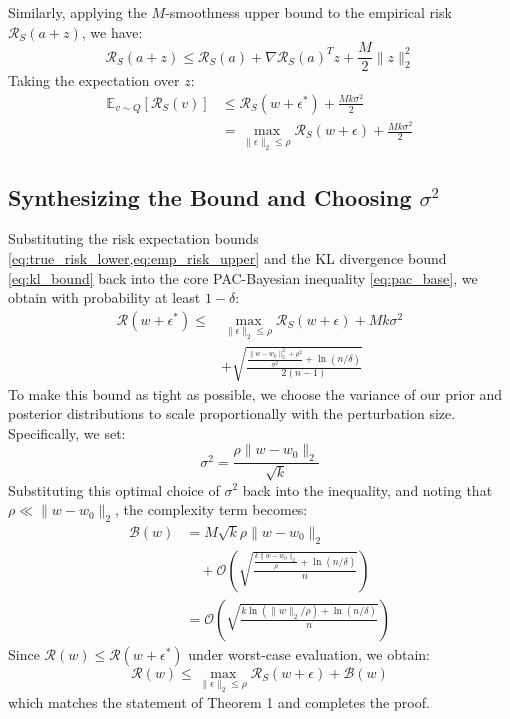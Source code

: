 \documentclass{article}
\begin{document}
Similarly, applying the $M$-smoothness upper bound to the empirical risk $\mathcal{R}_S(a+z)$, we have:
\begin{equation}
    \mathcal{R}_S(a + z) \le \mathcal{R}_S(a) + \nabla \mathcal{R}_S(a)^T z + \frac{M}{2} \| z \|_2^2
\end{equation}
Taking the expectation over $z$:
\begin{align}
    \mathbb{E}_{v \sim Q}[\mathcal{R}_S(v)] &\le \mathcal{R}_S(w + \epsilon^*) + \frac{M k \sigma^2}{2} \nonumber \\
    &= \max_{\|\epsilon\|_2 \le \rho} \mathcal{R}_S(w + \epsilon) + \frac{M k \sigma^2}{2}
\label{eq:emp_risk_upper}
\end{align}

\subsection{Synthesizing the Bound and Choosing $\sigma^2$}
Substituting the risk expectation bounds \cref{eq:true_risk_lower,eq:emp_risk_upper} and the KL divergence bound \cref{eq:kl_bound} back into the core PAC-Bayesian inequality \cref{eq:pac_base}, we obtain with probability at least $1 - \delta$:
\begin{align}
    \mathcal{R}(w + \epsilon^*) \le &\max_{\|\epsilon\|_2 \le \rho} \mathcal{R}_S(w + \epsilon) + M k \sigma^2 \nonumber \\
    &+ \sqrt{\frac{\frac{\| w - w_0 \|_2^2 + \rho^2}{\sigma^2} + \ln(n/\delta)}{2(n-1)}}
\end{align}
To make this bound as tight as possible, we choose the variance of our prior and posterior distributions to scale proportionally with the perturbation size. Specifically, we set:
\begin{equation}
    \sigma^2 = \frac{\rho \| w - w_0 \|_2}{\sqrt{k}}
\end{equation}
Substituting this optimal choice of $\sigma^2$ back into the inequality, and noting that $\rho \ll \|w - w_0\|_2$, the complexity term becomes:
\begin{align}
    \mathcal{B}(w) &= M \sqrt{k} \rho \| w - w_0 \|_2 \nonumber \\
    &\quad + \mathcal{O}\left( \sqrt{\frac{\frac{k \| w - w_0 \|_2}{\rho} + \ln(n/\delta)}{n}} \right) \nonumber \\
    &= \mathcal{O}\left( \sqrt{\frac{k \ln(\| w \|_2 / \rho) + \ln(n/\delta)}{n}} \right)
\end{align}
Since $\mathcal{R}(w) \le \mathcal{R}(w + \epsilon^*)$ under worst-case evaluation, we obtain:
\begin{equation}
    \mathcal{R}(w) \le \max_{\|\epsilon\|_2 \le \rho} \mathcal{R}_S(w + \epsilon) + \mathcal{B}(w)
\end{equation}
which matches the statement of Theorem 1 and completes the proof.



\end{document}
